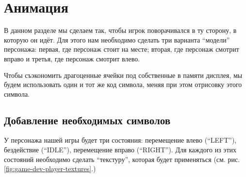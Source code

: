 \documentclass[../sparc.tex]{subfiles}
\begin{document}
\section{Анимация}

В данном разделе мы сделаем так, чтобы игрок поворачивался в ту сторону, в
которую он идёт.  Для этого нам необходимо сделать три варианта ``модели''
персонажа: первая, где персонаж стоит на месте; вторая, где персонаж смотрит
вправо и третья, где персонаж смотрит влево.

Чтобы съэкономить драгоценные ячейки под собственные в памяти дисплея, мы будем
использовать один и тот же код символа, меняя при этом отрисовку этого символа.

\subsection{Добавление необходимых символов}

У персонажа нашей игры будет три состояния: перемещение влево (``LEFT''),
бездействие (``IDLE''), перемещение вправо (``RIGHT'').  Для каждого из этих
состояний необходимо сделать ``текстуру'', которая будет применяться
(см. рис. \ref{fig:game-dev-player-textures}.)
\end{document}
